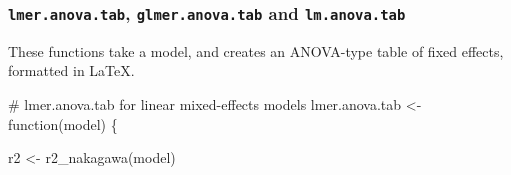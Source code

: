 \documentclass[
  bookmarksnumbered]{article}
\newenvironment{Shaded}{\begin{snugshade}}{\end{snugshade}}
\newcommand{\CommentTok}[1]{\textcolor[rgb]{0.50,0.62,0.50}{#1}}
\newcommand{\ControlFlowTok}[1]{\textcolor[rgb]{0.94,0.87,0.69}{#1}}
\newcommand{\FunctionTok}[1]{\textcolor[rgb]{0.94,0.94,0.56}{#1}}
\newcommand{\NormalTok}[1]{\textcolor[rgb]{0.80,0.80,0.80}{#1}}
\newcommand{\OtherTok}[1]{\textcolor[rgb]{0.94,0.94,0.56}{#1}}
\begin{document}
\subsubsection{\texorpdfstring{\texttt{lmer.anova.tab}, \texttt{glmer.anova.tab} and \texttt{lm.anova.tab}}{lmer.anova.tab, glmer.anova.tab and lm.anova.tab}}\label{lmer.anova.tab-glmer.anova.tab-and-lm.anova.tab}

These functions take a model, and creates an ANOVA-type table of fixed effects, formatted in \LaTeX.

\begin{Shaded}
\begin{Highlighting}[]
\CommentTok{\# lmer.anova.tab for linear mixed{-}effects models}
\NormalTok{lmer.anova.tab }\OtherTok{\textless{}{-}} \ControlFlowTok{function}\NormalTok{(model) \{}
  
\NormalTok{  r2 }\OtherTok{\textless{}{-}} \FunctionTok{r2\_nakagawa}\NormalTok{(model)}
  

\end{Highlighting}
\end{Shaded}
\end{document}
